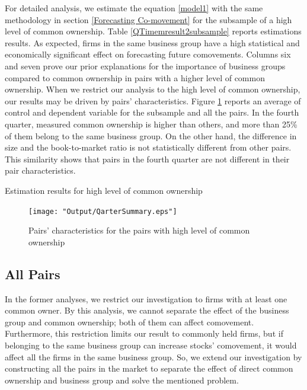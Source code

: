 \documentclass[12pt, a4paper]{article}
\begin{document}
For detailed analysis, we estimate the equation \ref{model1} with the same methodology in section \ref{Forecasting Co-movement}  for the subsample of a high level of common ownership. Table \ref{QTimemresult2subsample} reports estimations results. As expected, firms in the same business group have a high statistical and economically significant effect on forecasting future comovements. Columns six and seven prove our prior explanations for the importance of business groups compared to common ownership in pairs with a higher level of common ownership. When we restrict our analysis to the high level of common ownership, our results may be driven by pairs' characteristics. Figure \ref{QarterSummary} reports an average of control and dependent variable for the subsample and all the pairs. In the fourth quarter, measured common ownership is higher than others, and more than 25\% of them belong to the same business group. On the other hand, the difference in size and the book-to-market ratio is not statistically different from other pairs. This similarity shows that pairs in the fourth quarter are not different in their pair characteristics. 

\begin{table}[htbp]
	\centering
	\caption{\scriptsize Estimation results for high level of common ownership}
	\label{QTimemresult2subsample}
	\resizebox{0.75\textwidth}{!}{
		
	}
\end{table}
\begin{figure}[htbp]
	\centering  
	\texttt{[image: "Output/QarterSummary.eps"]}
	\caption{Pairs' characteristics for the pairs with high level of common ownership}
	\label{QarterSummary}
\end{figure}

\FloatBarrier

\subsection{All Pairs}
In the former analyses, we restrict our investigation to firms with at least one common owner. By this analysis, we cannot separate the effect of the business group and common ownership; both of them can affect comovement. Furthermore, this restriction limits our result to commonly held firms, but if belonging to the same business group can increase stocks' comovement, it would affect all the firms in the same business group. 
So, we extend our investigation by constructing all the pairs in the market to separate the effect of direct common ownership and business group and solve the mentioned problem. 
\end{document}

